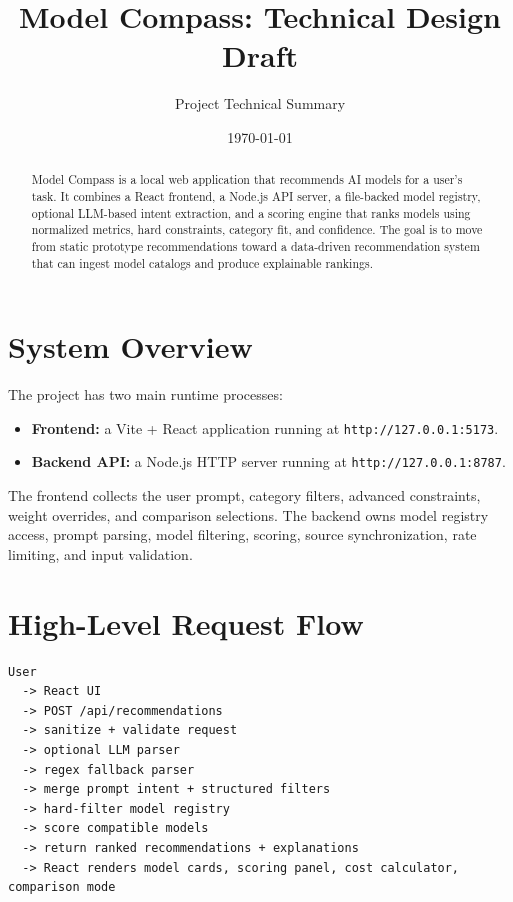 \documentclass[11pt]{article}
\title{Model Compass: Technical Design Draft}
\author{Project Technical Summary}
\date{\today}
\begin{document}
\maketitle

\begin{abstract}
Model Compass is a local web application that recommends AI models for a user's task. It combines a React frontend, a Node.js API server, a file-backed model registry, optional LLM-based intent extraction, and a scoring engine that ranks models using normalized metrics, hard constraints, category fit, and confidence. The goal is to move from static prototype recommendations toward a data-driven recommendation system that can ingest model catalogs and produce explainable rankings.
\end{abstract}

\section{System Overview}

The project has two main runtime processes:

\begin{itemize}[leftmargin=*]
  \item \textbf{Frontend:} a Vite + React application running at \texttt{http://127.0.0.1:5173}.
  \item \textbf{Backend API:} a Node.js HTTP server running at \texttt{http://127.0.0.1:8787}.
\end{itemize}

The frontend collects the user prompt, category filters, advanced constraints, weight overrides, and comparison selections. The backend owns model registry access, prompt parsing, model filtering, scoring, source synchronization, rate limiting, and input validation.

\section{High-Level Request Flow}

\begin{lstlisting}[style=code]
User
  -> React UI
  -> POST /api/recommendations
  -> sanitize + validate request
  -> optional LLM parser
  -> regex fallback parser
  -> merge prompt intent + structured filters
  -> hard-filter model registry
  -> score compatible models
  -> return ranked recommendations + explanations
  -> React renders model cards, scoring panel, cost calculator, comparison mode
\end{lstlisting}
\end{document}
